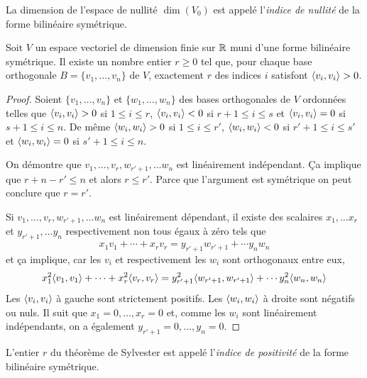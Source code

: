\begin{definition}
  La dimension de l'espace de nullité $\dim(V_0)$ est appelé l'\emph{indice de nullité} de la forme bilinéaire symétrique. 
\end{definition}

\begin{theorem} 
\label{thr:10}
Soit $V$
un espace vectoriel de dimension finie sur $\mathbb{R}$
muni d'une forme bilinéaire symétrique.
Il existe un nombre entier $r ≥0$ tel que, pour chaque base orthogonale 
  $B = \{v_1,\dots,v_n\}$ de $V$, 
 exactement $r$ des indices $i$ satisfont $\langle {v_i,v_i} \rangle>0$.
\end{theorem}


\begin{proof}
  Soient $\{v_1,\dots,v_n\}$
  et $\{w_1,\dots,w_n\}$ des
  bases orthogonales de $V$ ordonnées 
  telles que $\langle {v_i,v_i} \rangle >0 $
  si $1 \leq i \leq r$,
  $\langle {v_i,v_i} \rangle <0 $
  si $r+1 \leq i \leq s$
  et $\langle {v_i,v_i} \rangle =0 $
  si $s+1 \leq i \leq n$.
  De même $\langle {w_i,w_i} \rangle >0 $
  si $1 \leq i \leq r'$,
  $\langle {w_i,w_i} \rangle <0 $
  si $r'+1 \leq i \leq s'$
  et $\langle {w_i,w_i} \rangle =0 $ si $s'+1 \leq i \leq n$.



  On démontre que $v_1,\dots,v_r,w_{r'+1},\dots w_n$
  est linéairement indépendant. Ça implique que $r + n-r' \leq n$
  et alors $r \leq r'$.
  Parce que l'argument est symétrique on peut conclure que $r = r'$.

  Si $v_1,\dots,v_r,w_{r'+1},\dots w_n$ est linéairement dépendant, il existe des scalaires $x_1,\dots x_r$ et $y_{r'+1},\dots y_n$ respectivement  non tous égaux à zéro tels que 
  \begin{displaymath}
    x_1 v_1 + \cdots + x_r v_r = y_{r'+1} w_{r'+1} + \cdots y_n w_n 
  \end{displaymath}
et ça implique, car les $v_i$ et respectivement les $w_i$  sont orthogonaux entre eux, 
\begin{displaymath}
   x_1^2\langle {v_1,v_1} \rangle + \cdots + x_r^2 \langle {v_r,v_r} \rangle = y_{r'+1}^2 \langle {w_{r'+1},w_{r'+1}} \rangle + \cdots y_n^2 \langle {w_n,w_n} \rangle 
\end{displaymath}
Les $\langle {v_i,v_i} \rangle$ à gauche sont strictement positifs. Les $\langle {w_i,w_i} \rangle $ à droite sont négatifs ou nuls. Il suit que $x_1=0,\dots,x_r = 0$ et, comme les $w_i$ sont linéairement indépendants, on a également $y_{r'+1}=0,\dots,y_n=0$. 
\end{proof}


\begin{definition}
  \label{def:12}
  L'entier $r$ du théorème de Sylvester est appelé l'\emph{indice de positivité} de la forme bilinéaire symétrique. 
\end{definition}



